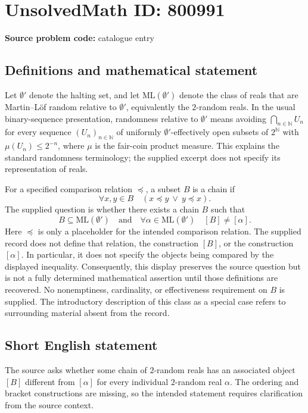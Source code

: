 \documentclass[11pt]{article}
\newcommand{\N}{\mathbb{N}}
\begin{document}
\section*{UnsolvedMath ID: 800991}
\textbf{Source problem code:} catalogue entry
\subsection{Definitions and mathematical statement}
Let $\emptyset'$ denote the halting set, and let $\mathrm{ML}(\emptyset')$ denote the class of reals that are Martin--L\"of random relative to $\emptyset'$, equivalently the $2$-random reals. In the usual binary-sequence presentation, randomness relative to $\emptyset'$ means avoiding $\bigcap_{n\in\N}U_n$ for every sequence $(U_n)_{n\in\N}$ of uniformly $\emptyset'$-effectively open subsets of $2^{\N}$ with $\mu(U_n)\leq 2^{-n}$, where $\mu$ is the fair-coin product measure. This explains the standard randomness terminology; the supplied excerpt does not specify its representation of reals.

For a specified comparison relation $\preccurlyeq$, a subset $B$ is a chain if
\[
\forall x,y\in B\quad (x\preccurlyeq y\ \lor\ y\preccurlyeq x).
\]
The supplied question is whether there exists a chain $B$ such that
\[
B\subseteq\mathrm{ML}(\emptyset')
\quad\text{and}\quad
\forall\alpha\in\mathrm{ML}(\emptyset')\quad [B]\neq[\alpha].
\]
Here $\preccurlyeq$ is only a placeholder for the intended comparison relation. The supplied record does not define that relation, the construction $[B]$, or the construction $[\alpha]$. In particular, it does not specify the objects being compared by the displayed inequality. Consequently, this display preserves the source question but is not a fully determined mathematical assertion until those definitions are recovered. No nonemptiness, cardinality, or effectiveness requirement on $B$ is supplied. The introductory description of this class as a special case refers to surrounding material absent from the record.
\subsection{Short English statement}
The source asks whether some chain of $2$-random reals has an associated object $[B]$ different from $[\alpha]$ for every individual $2$-random real $\alpha$. The ordering and bracket constructions are missing, so the intended statement requires clarification from the source context.
\end{document}
